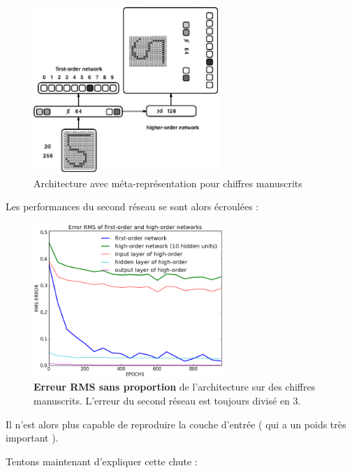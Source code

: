 \documentclass[a4paper,12pt, twoside]{article}
\begin{document}
\begin{figure}[H]
\begin{center}
 \includegraphics[height=240px]{../cleeremans_2007/digit_reco/schema_handwritten.png}
\end{center}
\caption{ Architecture avec méta-représentation pour chiffres manuscrits}
\end{figure}

Les performances du second réseau se sont alors écroulées : 
\begin{figure}[H]
\begin{center}
 \includegraphics[height=220px]{../cleeremans_2007/digit_reco/rms_handwritten_ffa.png}
\end{center}
\caption{ \textbf{Erreur RMS sans proportion} de l'architecture sur des chiffres manuscrits.
L'erreur du second réseau est toujours divisé en 3.}
\end{figure}

Il n'est alors plus capable de reproduire la couche d'entrée ( qui a un poids très important ).


Tentons maintenant d'expliquer cette chute :
\end{document}
